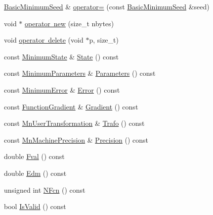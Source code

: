 \begin{DoxyCompactItemize}
\item 
\mbox{\hyperlink{classROOT_1_1Minuit2_1_1BasicMinimumSeed}{Basic\+Minimum\+Seed}} \& \mbox{\hyperlink{classROOT_1_1Minuit2_1_1BasicMinimumSeed_aeffefca123cbfd95d19fa7fb7e087431}{operator=}} (const \mbox{\hyperlink{classROOT_1_1Minuit2_1_1BasicMinimumSeed}{Basic\+Minimum\+Seed}} \&seed)
\item 
void $\ast$ \mbox{\hyperlink{classROOT_1_1Minuit2_1_1BasicMinimumSeed_ae9ee17ec0140aa209e488b064675f3c3}{operator new}} (size\+\_\+t nbytes)
\item 
void \mbox{\hyperlink{classROOT_1_1Minuit2_1_1BasicMinimumSeed_ae2af98f9f03cfe5e5202153b914ff120}{operator delete}} (void $\ast$p, size\+\_\+t)
\item 
const \mbox{\hyperlink{classROOT_1_1Minuit2_1_1MinimumState}{Minimum\+State}} \& \mbox{\hyperlink{classROOT_1_1Minuit2_1_1BasicMinimumSeed_a92e671b9a963d83076238c2e2b283e7c}{State}} () const
\item 
const \mbox{\hyperlink{classROOT_1_1Minuit2_1_1MinimumParameters}{Minimum\+Parameters}} \& \mbox{\hyperlink{classROOT_1_1Minuit2_1_1BasicMinimumSeed_a0aec3622cdc4f1c52a4be74f8b96059a}{Parameters}} () const
\item 
const \mbox{\hyperlink{classROOT_1_1Minuit2_1_1MinimumError}{Minimum\+Error}} \& \mbox{\hyperlink{classROOT_1_1Minuit2_1_1BasicMinimumSeed_a108de61cfe9f1766c3d7e251202a29df}{Error}} () const
\item 
const \mbox{\hyperlink{classROOT_1_1Minuit2_1_1FunctionGradient}{Function\+Gradient}} \& \mbox{\hyperlink{classROOT_1_1Minuit2_1_1BasicMinimumSeed_ab61377b63a177c93629ccb3e69e173db}{Gradient}} () const
\item 
const \mbox{\hyperlink{classROOT_1_1Minuit2_1_1MnUserTransformation}{Mn\+User\+Transformation}} \& \mbox{\hyperlink{classROOT_1_1Minuit2_1_1BasicMinimumSeed_aa40157cea0a8a75b56af25bbc64f8d39}{Trafo}} () const
\item 
const \mbox{\hyperlink{classROOT_1_1Minuit2_1_1MnMachinePrecision}{Mn\+Machine\+Precision}} \& \mbox{\hyperlink{classROOT_1_1Minuit2_1_1BasicMinimumSeed_af06c66e8851f7314915e01e0bedb200c}{Precision}} () const
\item 
double \mbox{\hyperlink{classROOT_1_1Minuit2_1_1BasicMinimumSeed_a40b43b611717121256cd72bf40a3d5d7}{Fval}} () const
\item 
double \mbox{\hyperlink{classROOT_1_1Minuit2_1_1BasicMinimumSeed_a10659878d070bed73df23682eab3e88e}{Edm}} () const
\item 
unsigned int \mbox{\hyperlink{classROOT_1_1Minuit2_1_1BasicMinimumSeed_a1d34718bf163936432ef05dea799c469}{N\+Fcn}} () const
\item 
bool \mbox{\hyperlink{classROOT_1_1Minuit2_1_1BasicMinimumSeed_ab53f2619d2b6be3d3d9303f8de29ab28}{Is\+Valid}} () const
\end{DoxyCompactItemize}


